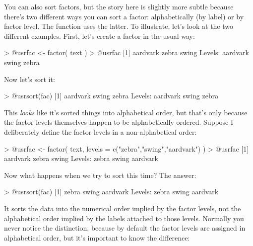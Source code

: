 You can also sort factors, but the story here is slightly more subtle because there's two different ways you can sort a factor: alphabetically (by label) or by factor level. The  function uses the latter. To illustrate, let's look at the two different examples. First, let's create a factor in the usual way:
\begin{rblock1}
> @usr{fac <- factor( text )}
> @usr{fac}
[1] aardvark zebra    swing   
Levels: aardvark swing zebra
\end{rblock1}
Now let's sort it:
\begin{rblock1}
> @usr{sort(fac)}
[1] aardvark swing    zebra   
Levels: aardvark swing zebra
\end{rblock1}
This {\it looks} like it's sorted things into alphabetical order, but that's only because the factor levels themselves happen to be alphabetically ordered. Suppose I deliberately define the factor levels in a non-alphabetical order:
\begin{rblock1}
> @usr{fac <- factor( text, levels = c("zebra","swing","aardvark") )}
> @usr{fac}
[1] aardvark zebra    swing   
Levels: zebra swing aardvark
\end{rblock1}
Now what happens when we try to sort  this time? The answer:
\begin{rblock1}
> @usr{sort(fac)}
[1] zebra    swing    aardvark
Levels: zebra swing aardvark
\end{rblock1}
It sorts the data into the numerical order implied by the factor levels, not the alphabetical order implied by the labels attached to those levels. Normally you never notice the distinction, because by default the factor levels are assigned in alphabetical order, but it's important to know the difference:


